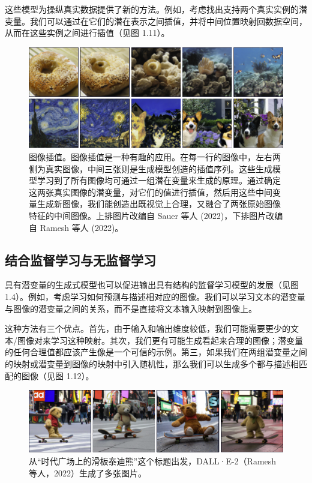 \documentclass[lang=cn,newtx,10pt,scheme=chinese]{elegantbook}
\begin{document}
这些模型为操纵真实数据提供了新的方法。例如，考虑找出支持两个真实实例的潜变量。我们可以通过在它们的潜在表示之间插值，并将中间位置映射回数据空间，从而在这些实例之间进行插值（见图 1.11）。

\begin{figure}
	\centering
	\includegraphics[width=0.7\linewidth]{PDFFigures/UDLChap1PDF/IntroInterpolate.pdf}
	\caption{图像插值。图像插值是一种有趣的应用。在每一行的图像中，左右两侧为真实图像，中间三张则是生成模型创造的插值序列。这些生成模型学习到了所有图像均可通过一组潜在变量来生成的原理。通过确定这两张真实图像的潜变量，对它们的值进行插值，然后用这些中间变量生成新图像，我们能创造出既视觉上合理，又融合了两张原始图像特征的中间图像。上排图片改编自 Sauer 等人 (2022)，下排图片改编自 Ramesh 等人 (2022)。}
\end{figure}


\subsection{结合监督学习与无监督学习}
具有潜变量的生成式模型也可以促进输出具有结构的监督学习模型的发展（见图 1.4）。例如，考虑学习如何预测与描述相对应的图像。我们可以学习文本的潜变量与图像的潜变量之间的关系，而不是直接将文本输入映射到图像上。

这种方法有三个优点。首先，由于输入和输出维度较低，我们可能需要更少的文本/图像对来学习这种映射。其次，我们更有可能生成看起来合理的图像；潜变量的任何合理值都应该产生像是一个可信的示例。第三，如果我们在两组潜变量之间的映射或潜变量到图像的映射中引入随机性，那么我们可以生成多个都与描述相匹配的图像（见图 1.12）。

\begin{figure}
	\centering
	\includegraphics[width=0.7\linewidth]{PDFFigures/UDLChap1PDF/IntroVariety.pdf}
	\caption{从“时代广场上的滑板泰迪熊”这个标题出发，DALL·E-2（Ramesh 等人，2022）生成了多张图片。}
\end{figure}
\end{document}
